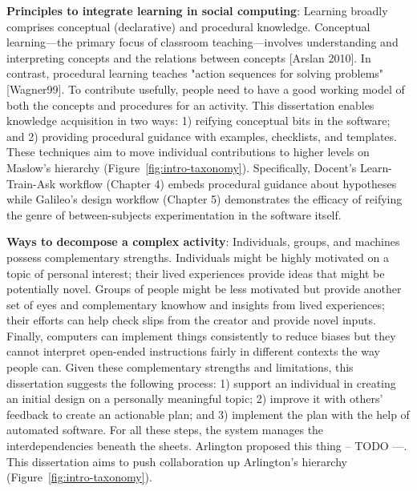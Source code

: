 \textbf{Principles to integrate learning in social computing}: Learning broadly comprises conceptual (declarative) and procedural knowledge. Conceptual learning---the primary focus of classroom teaching---involves understanding and interpreting concepts and the relations between concepts [Arslan 2010]. In contrast, procedural learning teaches "action sequences for solving problems" [Wagner99]. To contribute usefully, people need to have a good working model of both the concepts and procedures for an activity. This dissertation enables knowledge acquisition in two ways: 1) reifying conceptual bits in the software; and 2) providing procedural guidance with examples, checklists, and templates. These techniques aim to move individual contributions to higher levels on Maslow's hierarchy (Figure~\ref{fig:intro-taxonomy}). 
Specifically, Docent's Learn-Train-Ask workflow (Chapter 4) embeds procedural guidance about hypotheses while Galileo's design workflow (Chapter 5) demonstrates the efficacy of reifying the genre of between-subjects experimentation in the software itself.


\textbf{Ways to decompose a complex activity}: 
Individuals, groups, and machines possess complementary strengths. Individuals might be highly motivated on a topic of personal interest; their lived experiences provide ideas that might be potentially novel. Groups of people might be less motivated but provide another set of eyes and complementary knowhow and insights from lived experiences; their efforts can help check slips from the creator and provide novel inputs. Finally, computers can implement things consistently to reduce biases but they cannot interpret open-ended instructions fairly in different contexts the way people can. Given these complementary strengths and limitations, this dissertation suggests the following process: 1) support an individual in creating an initial design on a personally meaningful topic; 2) improve it with others' feedback to create an actionable plan; and 3) implement the plan with the help of automated software. For all these steps, the system manages the interdependencies beneath the sheets. Arlington proposed this thing -- TODO ---. This dissertation aims to push collaboration up Arlington's hierarchy (Figure~\ref{fig:intro-taxonomy}). 

